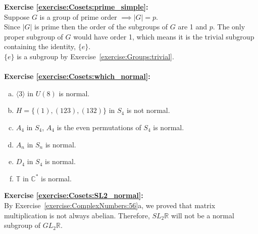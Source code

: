 \noindent\textbf{Exercise \ref{exercise:Cosets:prime_simple}:}
\\
Suppose $G$ is a group of prime order $\implies |G| = p$.
\\
Since $|G|$ is prime then the order of the subgroups of $G$ are 1 and $p$.  The only proper subgroup of $G$ would have order 1, which means it is the trivial subgroup containing the identity, $\{e\}$.
\\
$\{e\}$ is a subgroup by Exercise~\ref{exercise:Groups:trivial}.
\\
\\
\noindent\textbf{Exercise \ref{exercise:Cosets:which_normal}:}
\begin{enumerate}[(a)]


\item
$\langle 3 \rangle$ in $U(8)$ is normal.


\item
$H = \{ (1), (123), (132) \}$ in $S_4$ is not normal.

\item
$A_4$ in $S_4$, $A_4$ is the even permutations of $S_4$ is normal.

\item
$A_n$ in $S_n$ is normal.

\item
$D_4$ in $S_4$ is normal.

\item
${\mathbb T}$ in ${\mathbb C}^\ast$ is normal.

\end{enumerate}


\noindent\textbf{Exercise \ref{exercise:Cosets:SL2_normal}:}
\\
By Exercise~\ref{exercise:ComplexNumbers:56}a, we proved that matrix multiplication is not always abelian. Therefore, $SL_2{\mathbb R}$ will not be a normal subgroup of $GL_2{\mathbb R}$.

